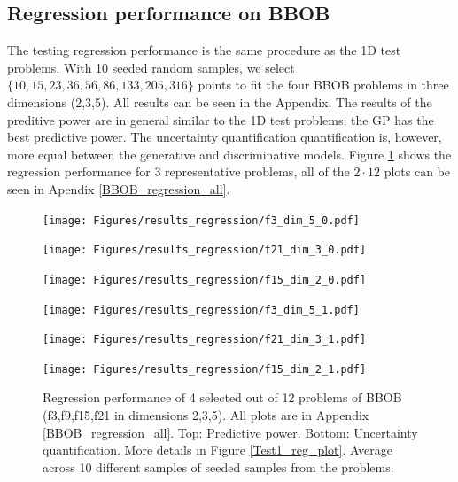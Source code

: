 \subsection{Regression performance on BBOB}
The testing regression performance is the same procedure as the 1D test problems. With 10 seeded
random samples, we select $\{10, 15, 23, 36, 56, 86, 133, 205, 316\}$ points to fit the four BBOB
problems in three dimensions (2,3,5). All results can be seen in the Appendix. The results of the
preditive power are in general similar to the 1D test problems; the GP has the best predictive
power. The uncertainty quantification quantification is, however, more equal between the generative
and discriminative models. Figure \ref{BBOB_regression} shows the regression performance for 3
representative problems, all of the $2\cdot 12$ plots can be seen in Apendix \ref{BBOB_regression_all}. 

\begin{figure}[H]
  \centering
  \begin{minipage}[b]{0.32\textwidth}
   \texttt{[image: Figures/results\_regression/f3\_dim\_5\_0.pdf]}
  \end{minipage}
  \hfill
  \begin{minipage}[b]{0.32\textwidth}
    \texttt{[image: Figures/results\_regression/f21\_dim\_3\_0.pdf]}
   \end{minipage}
   \hfill
   \begin{minipage}[b]{0.32\textwidth}
    \texttt{[image: Figures/results\_regression/f15\_dim\_2\_0.pdf]}
   \end{minipage}
   
     \begin{minipage}[b]{0.32\textwidth}
   \texttt{[image: Figures/results\_regression/f3\_dim\_5\_1.pdf]}
  \end{minipage}
  \hfill
  \begin{minipage}[b]{0.32\textwidth}
    \texttt{[image: Figures/results\_regression/f21\_dim\_3\_1.pdf]}
   \end{minipage}
   \hfill
   \begin{minipage}[b]{0.32\textwidth}
    \texttt{[image: Figures/results\_regression/f15\_dim\_2\_1.pdf]}
   \end{minipage}
   
  \caption{Regression performance of 4 selected out of 12 problems of BBOB (f3,f9,f15,f21 in
  dimensions 2,3,5). All plots are in Appendix \ref{BBOB_regression_all}. Top: Predictive power. Bottom: Uncertainty
  quantification. More details in Figure \ref{Test1_reg_plot}. Average across 10 different samples
  of seeded samples from the problems.}
  \label{BBOB_regression}
\end{figure}

